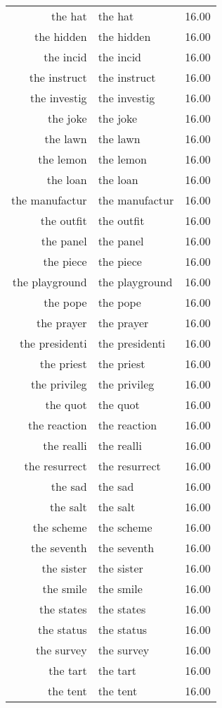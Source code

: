 \begin{table}[ht]
\begin{tabular}{rlr}
  the hat & the hat & 16.00 \\ 
  the hidden & the hidden & 16.00 \\ 
  the incid & the incid & 16.00 \\ 
  the instruct & the instruct & 16.00 \\ 
  the investig & the investig & 16.00 \\ 
  the joke & the joke & 16.00 \\ 
  the lawn & the lawn & 16.00 \\ 
  the lemon & the lemon & 16.00 \\ 
  the loan & the loan & 16.00 \\ 
  the manufactur & the manufactur & 16.00 \\ 
  the outfit & the outfit & 16.00 \\ 
  the panel & the panel & 16.00 \\ 
  the piece & the piece & 16.00 \\ 
  the playground & the playground & 16.00 \\ 
  the pope & the pope & 16.00 \\ 
  the prayer & the prayer & 16.00 \\ 
  the presidenti & the presidenti & 16.00 \\ 
  the priest & the priest & 16.00 \\ 
  the privileg & the privileg & 16.00 \\ 
  the quot & the quot & 16.00 \\ 
  the reaction & the reaction & 16.00 \\ 
  the realli & the realli & 16.00 \\ 
  the resurrect & the resurrect & 16.00 \\ 
  the sad & the sad & 16.00 \\ 
  the salt & the salt & 16.00 \\ 
  the scheme & the scheme & 16.00 \\ 
  the seventh & the seventh & 16.00 \\ 
  the sister & the sister & 16.00 \\ 
  the smile & the smile & 16.00 \\ 
  the states & the states & 16.00 \\ 
  the status & the status & 16.00 \\ 
  the survey & the survey & 16.00 \\ 
  the tart & the tart & 16.00 \\ 
  the tent & the tent & 16.00 \\ 

\end{tabular}
\end{table}
